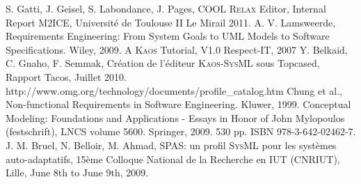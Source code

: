 \documentclass[10pt, conference, compsocconf]{IEEEtran}
\def\myrelax{\textsc{Relax}}                  %
\def\sysml{\textsc{SysML}}
\def\kaos{\textsc{Kaos}}
\begin{document}
\begin{thebibliography}{1}
S. Gatti, J. Geisel, S. Labondance, J. Pages, COOL \myrelax{} Editor, Internal Report M2ICE, Universit\'e de Toulouse II Le Mirail 2011.
A. V. Lamsweerde, Requirements Engineering: From System Goals to UML Models to Software Specifications. Wiley, 2009.
A \kaos{} Tutorial, V1.0  Respect-IT, 2007
Y. Belkaid, C. Gnaho, F. Semmak, Cr\'eation de l'\'editeur \kaos{}-\sysml{} sous Topcased, Rapport Tacos, Juillet 2010.
http://www.omg.org/technology/documents/profile\_catalog.htm
Chung et al., Non-functional Requirements in Software Engineering. Kluwer, 1999.
Conceptual Modeling: Foundations and Applications - Essays in Honor of John Mylopoulos (festschrift), LNCS volume 5600. Springer, 2009.  530 pp. ISBN 978-3-642-02462-7.
J. M. Bruel, N. Belloir, M. Ahmad, SPAS: un profil \sysml{} pour les syst\`emes auto-adaptatifs, 15\`eme Colloque National de la Recherche en IUT (CNRIUT), Lille, June 8th to June 9th, 2009.


\end{thebibliography}




\end{document}
